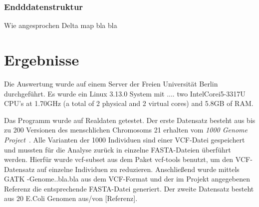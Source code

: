 \documentclass[12pt]{article}
\begin{document}
\subsubsection{Endddatenstruktur}
Wie angesprochen Delta map bla bla
\pagebreak
\section{Ergebnisse}
Die Auswertung wurde auf einem Server der Freien Universität Berlin durchgeführt. Es wurde ein Linux 3.13.0 System mit .... two Intel\textregistered Core\texttrademark i5-3317U CPU's at 1.70GHz (a total of 2 physical and 2 virtual cores) and 5.8GB of RAM. 

Das Programm wurde auf Realdaten getestet. Der erste Datensatz besteht aus bis zu 200 Versionen des menschlichen Chromosoms 21 erhalten vom \textit{1000 Genome Project}~\cite{1000genomes}. Alle Varianten der 1000 Individuen sind einer VCF-Datei gespeichert und mussten für die Analyse zurück in einzelne FASTA-Dateien überführt werden. Hierfür wurde vcf-subset aus dem Paket vcf-tools benutzt, um den VCF-Datensatz auf einzelne Individuen zu reduzieren. Anschließend wurde mittels GATK -Genome..bla.bla aus dem VCF-Format und der im Projekt angegebenen Referenz die entsprechende FASTA-Datei generiert. Der zweite Datensatz besteht aus 20 E.Coli Genomen aus/von [Referenz].
\end{document}
